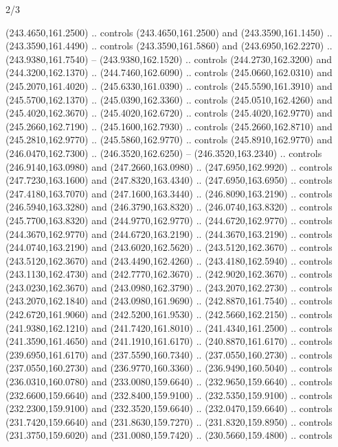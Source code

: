 \begin{flagdescription}{2/3}
\begin{scope}[xshift=0.5\flaglength,yshift=0.5\flagwidth,scale=\flagwidth/259.2]
\begin{scope}[y=0.8pt, x=0.8pt, yscale=-1,shift={(-243,-162)}]
      (243.4650,161.2500) .. controls (243.4650,161.2500) and (243.3590,161.1450) ..
      (243.3590,161.4490) .. controls (243.3590,161.5860) and (243.6950,162.2270) ..
      (243.9380,161.7540) -- (243.9380,162.1520) .. controls (244.2730,162.3200) and
      (244.3200,162.1370) .. (244.7460,162.6090) .. controls (245.0660,162.0310) and
      (245.2070,161.4020) .. (245.6330,161.0390) .. controls (245.5590,161.3910) and
      (245.5700,162.1370) .. (245.0390,162.3360) .. controls (245.0510,162.4260) and
      (245.4020,162.3670) .. (245.4020,162.6720) .. controls (245.4020,162.9770) and
      (245.2660,162.7190) .. (245.1600,162.7930) .. controls (245.2660,162.8710) and
      (245.2810,162.9770) .. (245.5860,162.9770) .. controls (245.8910,162.9770) and
      (246.0470,162.7300) .. (246.3520,162.6250) -- (246.3520,163.2340) .. controls
      (246.9140,163.0980) and (247.2660,163.0980) .. (247.6950,162.9920) .. controls
      (247.7230,163.1600) and (247.8320,163.4340) .. (247.6950,163.6950) .. controls
      (247.4180,163.7070) and (247.1600,163.3440) .. (246.8090,163.2190) .. controls
      (246.5940,163.3280) and (246.3790,163.8320) .. (246.0740,163.8320) .. controls
      (245.7700,163.8320) and (244.9770,162.9770) .. (244.6720,162.9770) .. controls
      (244.3670,162.9770) and (244.6720,163.2190) .. (244.3670,163.2190) .. controls
      (244.0740,163.2190) and (243.6020,162.5620) .. (243.5120,162.3670) .. controls
      (243.5120,162.3670) and (243.4490,162.4260) .. (243.4180,162.5940) .. controls
      (243.1130,162.4730) and (242.7770,162.3670) .. (242.9020,162.3670) .. controls
      (243.0230,162.3670) and (243.0980,162.3790) .. (243.2070,162.2730) .. controls
      (243.2070,162.1840) and (243.0980,161.9690) .. (242.8870,161.7540) .. controls
      (242.6720,161.9060) and (242.5200,161.9530) .. (242.5660,162.2150) .. controls
      (241.9380,162.1210) and (241.7420,161.8010) .. (241.4340,161.2500) .. controls
      (241.3590,161.4650) and (241.1910,161.6170) .. (240.8870,161.6170) .. controls
      (239.6950,161.6170) and (237.5590,160.7340) .. (237.0550,160.2730) .. controls
      (237.0550,160.2730) and (236.9770,160.3360) .. (236.9490,160.5040) .. controls
      (236.0310,160.0780) and (233.0080,159.6640) .. (232.9650,159.6640) .. controls
      (232.6600,159.6640) and (232.8400,159.9100) .. (232.5350,159.9100) .. controls
      (232.2300,159.9100) and (232.3520,159.6640) .. (232.0470,159.6640) .. controls
      (231.7420,159.6640) and (231.8630,159.7270) .. (231.8320,159.8950) .. controls
      (231.3750,159.6020) and (231.0080,159.7420) .. (230.5660,159.4800) .. controls

\end{scope}
\end{scope}
\end{flagdescription}
